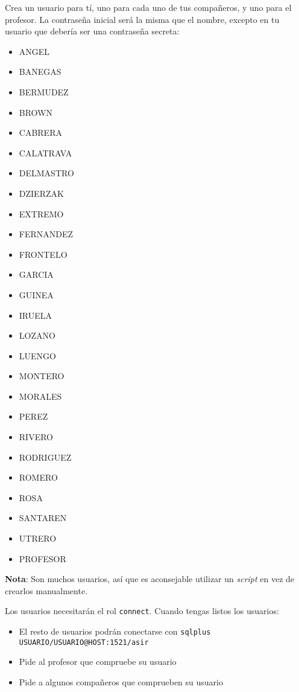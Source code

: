 \begin{homeworkProblem}

  Crea un usuario para tí, uno para cada uno de tus compañeros, y uno para el profesor. La contraseña inicial será la misma que el nombre, excepto en tu usuario que debería ser una contraseña secreta:
  \begin{multicols}{3}
    \begin{itemize}
    \item ANGEL
    \item BANEGAS
    \item BERMUDEZ
    \item BROWN
    \item CABRERA
    \item CALATRAVA
    \item DELMASTRO
    \item DZIERZAK
    \item EXTREMO
    \item FERNANDEZ
    \item FRONTELO
    \item GARCIA
    \item GUINEA
    \item IRUELA
    \item LOZANO
    \item LUENGO
    \item MONTERO
    \item MORALES
    \item PEREZ
    \item RIVERO
    \item RODRIGUEZ
    \item ROMERO
    \item ROSA
    \item SANTAREN
    \item UTRERO
    \item PROFESOR
    \end{itemize}
  \end{multicols}
  {\small \textbf{Nota}: Son muchos usuarios, así que es aconsejable utilizar un \textit{script} en vez de crearlos manualmente.}

  Los usuarios necesitarán el rol \texttt{connect}. Cuando tengas listos los usuarios:
  \begin{itemize}
    \item El resto de usuarios podrán conectarse con \texttt{sqlplus USUARIO/USUARIO@HOST:1521/asir}
    \item Pide al profesor que compruebe su usuario
    \item Pide a algunos compañeros que comprueben su usuario
  \end{itemize}
\end{homeworkProblem}

